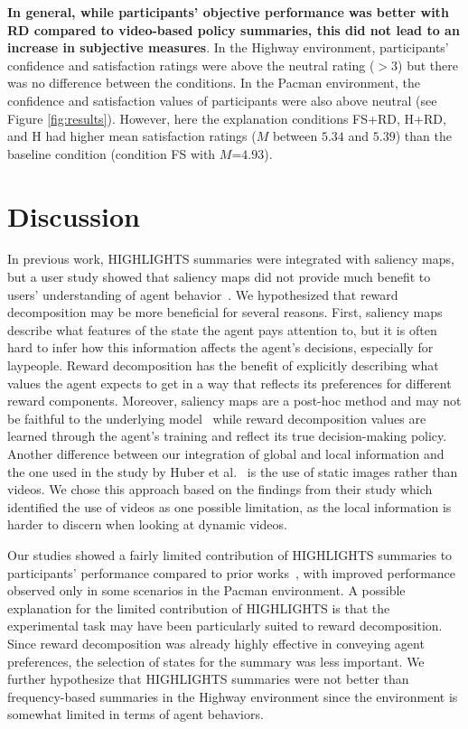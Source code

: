 \documentclass[runningheads]{llncs}
\newcommand{\shortcite}[1]{\cite{#1}}
\begin{document}
\textbf{In general, while participants' objective performance was better with RD compared to video-based policy summaries, this did not lead to an increase in subjective measures}.
In the Highway environment, participants' confidence and satisfaction ratings were above the neutral rating ($>3$) but there was no difference between the conditions.
In the Pacman environment, the confidence and satisfaction values of participants were also above neutral (see Figure \ref{fig:results}).
However, here the explanation conditions FS+RD, H+RD, and H had higher mean satisfaction ratings ($M$ between $5.34$ and $5.39$) than the baseline condition (condition FS with $M$=$4.93$).


\section{Discussion}

In previous work, HIGHLIGHTS summaries were integrated with saliency maps, but a user study showed that saliency maps did not provide much benefit to users' understanding of agent behavior~\cite{huber2020local}. We hypothesized that reward decomposition may be more beneficial for several reasons. First, saliency maps describe what features of the state the agent pays attention to, but it is often hard to infer how this information affects the agent's decisions, especially for laypeople. Reward decomposition has the benefit of explicitly describing what values the agent expects to get in a way that reflects its preferences for different reward components. Moreover, saliency maps are a post-hoc method and may not be faithful to the underlying model~\cite{rudin19,huber2022benchmarking} while reward decomposition values are learned through the agent's training and reflect its true decision-making policy. 
Another difference between our integration of global and local information and the one used in the study by Huber et al.~\shortcite{huber2020local} is the use of static images rather than videos. We chose this approach based on the findings from their study which identified the use of videos as one possible limitation, as the local information is harder to discern when looking at dynamic videos.


Our studies showed a fairly limited contribution of HIGHLIGHTS summaries to participants' performance compared to prior works~\cite{amir2018highlights,huber2020local}, with improved performance observed only in some scenarios in the Pacman environment. A possible explanation for the limited contribution of HIGHLIGHTS is that the experimental task may have been particularly suited to reward decomposition. Since reward decomposition was already highly effective in conveying agent preferences, the selection of states for the summary was less important. We further hypothesize that HIGHLIGHTS summaries were not better than frequency-based summaries in the Highway environment since the environment is somewhat limited in terms of agent behaviors.
\end{document}
